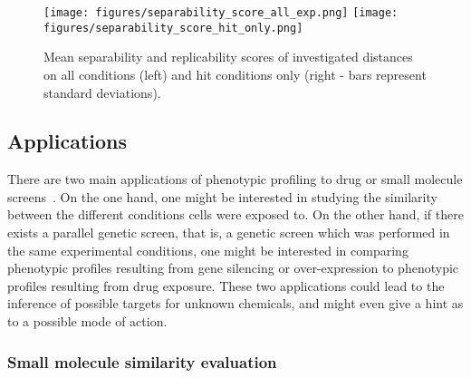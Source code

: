 \begin{figure*}[ht!]
\centerline{
\texttt{[image: figures/separability\_score\_all\_exp.png]}
\texttt{[image: figures/separability\_score\_hit\_only.png]}
}
\caption{Mean separability and replicability scores of investigated distances on all conditions (left) and hit conditions only (right - bars represent standard deviations).}
\label{separability}
\end{figure*}

\subsection{Applications}
There are two main applications of phenotypic profiling to drug or small molecule screens~\cite{pmid17401369}. On the one hand, one might be interested in studying the similarity between the different conditions cells were exposed to. On the other hand, if there exists a parallel genetic screen, that is, a genetic screen which was performed in the same experimental conditions, one might be interested in comparing phenotypic profiles resulting from gene silencing or over-expression to phenotypic profiles resulting from drug exposure. These two applications could lead to the inference of possible targets for unknown chemicals, and might even give a hint as to a possible mode of action.

\subsubsection{Small molecule similarity evaluation}

